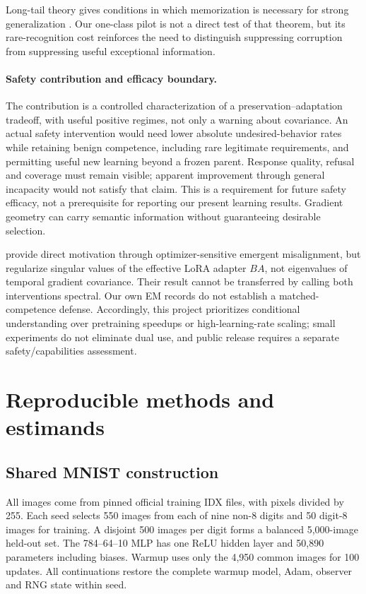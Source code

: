 \documentclass[10pt]{article}
\begin{document}
Long-tail theory gives conditions in which memorization is necessary for strong generalization \citep{feldman2021longtail}. Our one-class pilot is not a direct test of that theorem, but its rare-recognition cost reinforces the need to distinguish suppressing corruption from suppressing useful exceptional information.

\paragraph{Safety contribution and efficacy boundary.}
The contribution is a controlled characterization of a preservation--adaptation tradeoff, with useful positive regimes, not only a warning about covariance. An actual safety intervention would need lower absolute undesired-behavior rates while retaining benign competence, including rare legitimate requirements, and permitting useful new learning beyond a frozen parent. Response quality, refusal and coverage must remain visible; apparent improvement through general incapacity would not satisfy that claim. This is a requirement for future safety efficacy, not a prerequisite for reporting our present learning results. Gradient geometry can carry semantic information without guaranteeing desirable selection.

\citet{brown2026evil} provide direct motivation through optimizer-sensitive emergent misalignment, but regularize singular values of the effective LoRA adapter $BA$, not eigenvalues of temporal gradient covariance. Their result cannot be transferred by calling both interventions spectral. Our own EM records do not establish a matched-competence defense. Accordingly, this project prioritizes conditional understanding over pretraining speedups or high-learning-rate scaling; small experiments do not eliminate dual use, and public release requires a separate safety/capabilities assessment.

\clearpage
\appendix
\section{Reproducible methods and estimands}\label{app:methods}
\subsection{Shared MNIST construction}
All images come from pinned official training IDX files, with pixels divided by 255. Each seed selects 550 images from each of nine non-8 digits and 50 digit-8 images for training. A disjoint 500 images per digit forms a balanced 5,000-image held-out set. The 784--64--10 MLP has one ReLU hidden layer and 50,890 parameters including biases. Warmup uses only the 4,950 common images for 100 updates. All continuations restore the complete warmup model, Adam, observer and RNG state within seed.
\end{document}
